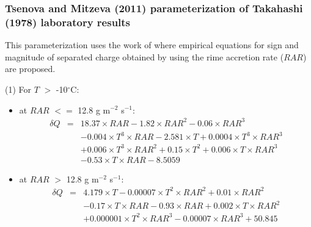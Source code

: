 \subsubsection{Tsenova and Mitzeva (2011) parameterization of Takahashi (1978) laboratory results}

This parameterization uses the work of \citet{Tsenova-2011} where empirical equations for sign and magnitude of separated charge obtained by \citet{Takahashi-1978} using the rime accretion rate ($RAR$) are proposed.

\noindent
(1) For $T$ $>$ -10$^{\circ}$C:
\begin{itemize}
  \item at $RAR$ $<=$ 12.8 g m$^{-2}$ s$^{-1}$:
\begin{eqnarray}
 \delta Q & = & 18.37 \times RAR - 1.82 \times RAR^{2} - 0.06 \times RAR^{3} \nonumber \\
          &   & - 0.004 \times T^{3} \times RAR - 2.581 \times T + 0.0004 \times T^{3} \times RAR^{3} \nonumber \\
          &   & + 0.006 \times T^{3} \times RAR^{2} + 0.15 \times T^{2} + 0.006 \times T \times RAR^{3} \nonumber \\ 
          &   & - 0.53 \times T \times RAR - 8.5059 
\end{eqnarray}
  \item at $RAR$ $>$ 12.8 g m$^{-2}$ s$^{-1}$:
\begin{eqnarray}
 \delta Q & = & 4.179 \times T - 0.00007 \times T^{2} \times RAR^{2} + 0.01 \times RAR^{2} \nonumber \\
          &   & - 0.17 \times T \times RAR - 0.93 \times RAR + 0.002 \times T \times RAR^{2} \nonumber \\
          &   & + 0.000001 \times T^{2} \times RAR^{3} - 0.00007 \times RAR^{3} + 50.845
\end{eqnarray}
\end{itemize}

